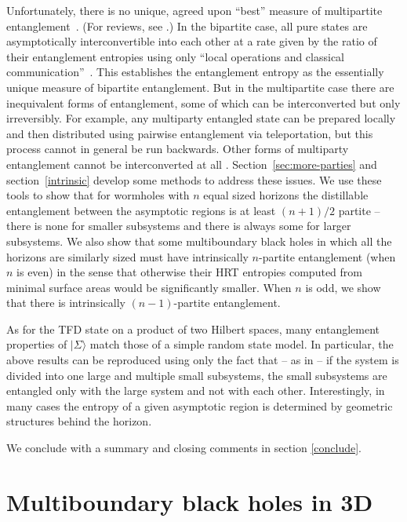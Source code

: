 \documentclass[12pt]{article}
\numberwithin{equation}{section}
\begin{document}
Unfortunately, there is no unique, agreed upon ``best'' measure of multipartite entanglement~\cite{vedral1997quantifying,bennett2000exact,barnum2001monotones}. (For reviews, see \cite{eisert2005multi,horodecki2009quantum}.) In the bipartite case, all pure states are asymptotically interconvertible into each other at a rate given by the ratio of their entanglement entropies using only ``local operations and classical communication''~\cite{bennett1996concentrating}. This establishes the entanglement entropy as the essentially unique measure of bipartite entanglement. But in the multipartite case there are inequivalent forms of entanglement, some of which can be interconverted but only irreversibly. For example, any multiparty entangled state can be prepared locally and then distributed using pairwise entanglement via teleportation, but this process cannot in general be run backwards. Other forms of multiparty entanglement cannot be interconverted at all \cite{dur2000three}.  Section~\ref{sec:more-parties} and section~\ref{intrinsic}  develop some methods to address these issues. We use these tools to show that for wormholes with $n$ equal sized horizons the distillable entanglement between the asymptotic regions is at least $(n+1)/2$ partite -- there is none for smaller subsystems and there is always some for larger subsystems.  We also show that some multiboundary black holes in which all the horizons are similarly sized must have intrinsically $n$-partite entanglement (when $n$ is even) in the sense that otherwise their HRT entropies computed from minimal surface areas would be significantly smaller. When $n$ is odd, we show that there is intrinsically $(n-1)$-partite entanglement.


As for the TFD state on a product of  two Hilbert spaces, many entanglement properties of $|\Sigma\rangle$ match those of a simple random state model.  In particular, the above results can be reproduced using only the fact that -- as in \cite{Page:1993df} -- if the system is divided into one large and multiple small subsystems, the small subsystems are entangled only with the large system and not with each other.  Interestingly, in many cases the entropy of a given asymptotic region is determined by geometric structures behind the horizon.

We conclude with a summary and closing comments in section \ref{conclude}.

%
\section{Multiboundary black holes in 3D}
\label{review}
%
\end{document}
